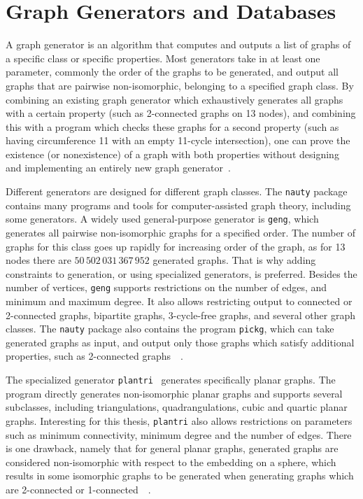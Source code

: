 \section{Graph Generators and Databases}
\label{sec:generators}

A graph generator is an algorithm that computes and outputs a list of graphs of a specific class or specific properties. Most generators take in at least one parameter, commonly the order of the graphs to be generated, and output all graphs that are pairwise non-isomorphic, belonging to a specified graph class. By combining an existing graph generator which exhaustively generates all graphs with a certain property (such as 2-connected graphs on 13 nodes), and combining this with a program which checks these graphs for a second property (such as having circumference 11 with an empty 11-cycle intersection), one can prove the existence (or nonexistence) of a graph with both properties without designing and implementing an entirely new graph generator~\cite{article:jorik-jooken}.

Different generators are designed for different graph classes. The \texttt{nauty} package~\cite{lib:nauty} contains many programs and tools for computer-assisted graph theory, including some generators. A widely used general-purpose generator is \texttt{geng}, which generates all pairwise non-isomorphic graphs for a specified order. The number of graphs for this class goes up rapidly for increasing order of the graph, as for 13 nodes there are $50\,502\,031\,367\,952$ generated graphs. That is why adding constraints to generation, or using specialized generators, is preferred. Besides the number of vertices, \texttt{geng} supports restrictions on the number of edges, and minimum and maximum degree. It also allows restricting output to connected or 2-connected graphs, bipartite graphs, 3-cycle-free graphs, and several other graph classes. The \texttt{nauty} package also contains the program \texttt{pickg}, which can take generated graphs as input, and output only those graphs which satisfy additional properties, such as 2-connected graphs~\cite{article:jorik-jooken}~\cite{lib:nauty}.

The specialized generator \texttt{plantri}~\cite{lib:plantri} generates specifically planar graphs. The program directly generates non-isomorphic planar graphs and supports several subclasses, including triangulations, quadrangulations, cubic and quartic planar graphs. Interesting for this thesis, \texttt{plantri} also allows restrictions on parameters such as minimum connectivity, minimum degree and the number of edges. There is one drawback, namely that for general planar graphs, generated graphs are considered non-isomorphic with respect to the embedding on a sphere, which results in some isomorphic graphs to be generated when generating graphs which are 2-connected or 1-connected~\cite{article:jorik-jooken}~\cite{lib:plantri}. 

